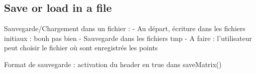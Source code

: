 \documentclass{report}
\begin{document}
\subsection{Save or load in a file}
Sauvegarde/Chargement dans un fichier :
    - Au départ, écriture dans les fichiers initiaux : bouh pas bien
    - Sauvegarde dans les fichiers tmp
    - A faire : l’utilisateur peut choisir le fichier où sont enregistrés les points

Format de sauvegarde : activation du header en true dans saveMatrix()
\end{document}
